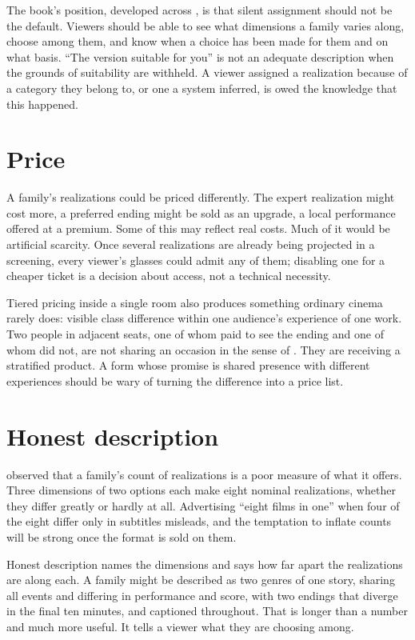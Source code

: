 The book's position, developed across , is that silent assignment should not be the default. Viewers should be able to see what dimensions a family varies along, choose among them, and know when a choice has been made for them and on what basis. ``The version suitable for you'' is not an adequate description when the grounds of suitability are withheld. A viewer assigned a realization because of a category they belong to, or one a system inferred, is owed the knowledge that this happened.

\section{Price}

A family's realizations could be priced differently. The expert realization might cost more, a preferred ending might be sold as an upgrade, a local performance offered at a premium. Some of this may reflect real costs. Much of it would be artificial scarcity. Once several realizations are already being projected in a screening, every viewer's glasses could admit any of them; disabling one for a cheaper ticket is a decision about access, not a technical necessity.

Tiered pricing inside a single room also produces something ordinary cinema rarely does: visible class difference within one audience's experience of one work. Two people in adjacent seats, one of whom paid to see the ending and one of whom did not, are not sharing an occasion in the sense of . They are receiving a stratified product. A form whose promise is shared presence with different experiences should be wary of turning the difference into a price list.

\section{Honest description}

 observed that a family's count of realizations is a poor measure of what it offers. Three dimensions of two options each make eight nominal realizations, whether they differ greatly or hardly at all. Advertising ``eight films in one'' when four of the eight differ only in subtitles misleads, and the temptation to inflate counts will be strong once the format is sold on them.

Honest description names the dimensions and says how far apart the realizations are along each. A family might be described as two genres of one story, sharing all events and differing in performance and score, with two endings that diverge in the final ten minutes, and captioned throughout. That is longer than a number and much more useful. It tells a viewer what they are choosing among.

